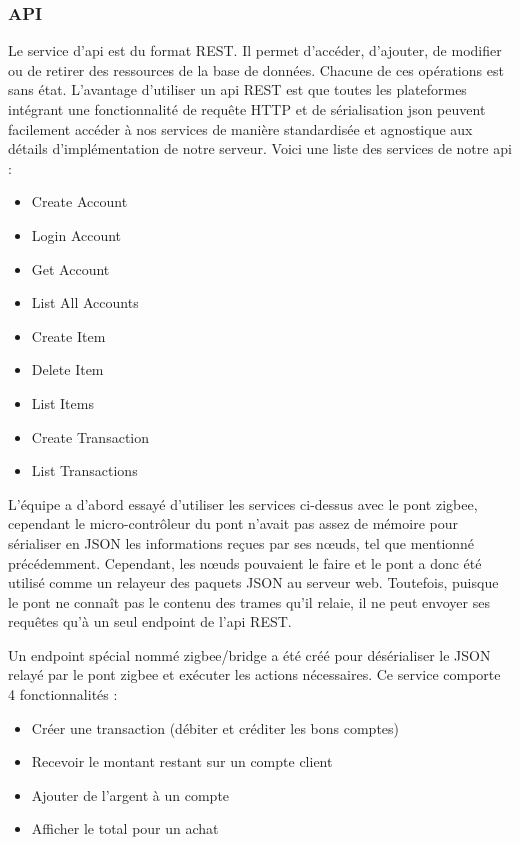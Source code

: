 		\subsubsection{API}
		Le service d’api est du format REST. Il permet d’accéder, d’ajouter, de modifier ou de retirer des ressources de la base de données. Chacune de ces opérations est sans état. L’avantage d’utiliser un api REST est que toutes les plateformes intégrant une fonctionnalité de requête HTTP et de sérialisation json peuvent facilement accéder à nos services de manière standardisée et agnostique aux détails d’implémentation de notre serveur. Voici une liste des services de notre api : 
		\begin{multicols}{3}
		\begin{itemize}
			\item Create Account
			\item Login Account
			\item Get Account
			\item List All Accounts
			\item Create Item
			\item Delete Item
			\item List Items
			\item Create Transaction
			\item List Transactions
		\end{itemize}
		\end{multicols}

		L’équipe a d’abord essayé d’utiliser les services ci-dessus avec le pont zigbee, cependant le micro-contrôleur du pont n’avait pas assez de mémoire pour sérialiser en JSON les informations reçues par ses n\oe{}uds, tel que mentionné précédemment. Cependant, les n\oe{}uds pouvaient le faire et le pont a donc été utilisé comme un relayeur des paquets JSON au serveur web. Toutefois, puisque le pont ne connaît pas le contenu des trames qu’il relaie, il ne peut envoyer ses requêtes qu’à un seul \og endpoint \fg{} de l’api REST. 

		Un \og endpoint \fg{} spécial nommé \og zigbee/bridge \fg{} a été créé pour désérialiser le JSON relayé par le pont zigbee et exécuter les actions nécessaires. Ce service comporte 4 fonctionnalités : 
		\begin{itemize}
			\item Créer une transaction (débiter et créditer les bons comptes)
			\item Recevoir le montant restant sur un compte client
			\item Ajouter de l’argent à un compte
			\item Afficher le total pour un achat
		\end{itemize}

